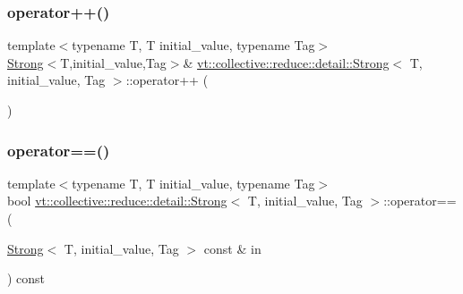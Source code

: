 \subsubsection{\texorpdfstring{operator++()}{operator++()}}
{\footnotesize\ttfamily template$<$typename T, T initial\+\_\+value, typename Tag$>$ \\
\hyperlink{structvt_1_1collective_1_1reduce_1_1detail_1_1_strong}{Strong}$<$T,initial\+\_\+value,Tag$>$\& \hyperlink{structvt_1_1collective_1_1reduce_1_1detail_1_1_strong}{vt\+::collective\+::reduce\+::detail\+::\+Strong}$<$ T, initial\+\_\+value, Tag $>$\+::operator++ (\begin{DoxyParamCaption}{ }\end{DoxyParamCaption})\hspace{0.3cm}{\ttfamily [inline]}}

\mbox{\label{structvt_1_1collective_1_1reduce_1_1detail_1_1_strong_ac8773530a7b4b1a3b5e54eb6f945c582}} 
\subsubsection{\texorpdfstring{operator==()}{operator==()}}
{\footnotesize\ttfamily template$<$typename T, T initial\+\_\+value, typename Tag$>$ \\
bool \hyperlink{structvt_1_1collective_1_1reduce_1_1detail_1_1_strong}{vt\+::collective\+::reduce\+::detail\+::\+Strong}$<$ T, initial\+\_\+value, Tag $>$\+::operator== (\begin{DoxyParamCaption}\item[{\hyperlink{structvt_1_1collective_1_1reduce_1_1detail_1_1_strong}{Strong}$<$ T, initial\+\_\+value, Tag $>$ const \&}]{in }\end{DoxyParamCaption}) const\hspace{0.3cm}{\ttfamily [inline]}}

\mbox{\label{structvt_1_1collective_1_1reduce_1_1detail_1_1_strong_a6abf31948f9dbd77f4caeb265fd68586}} 
